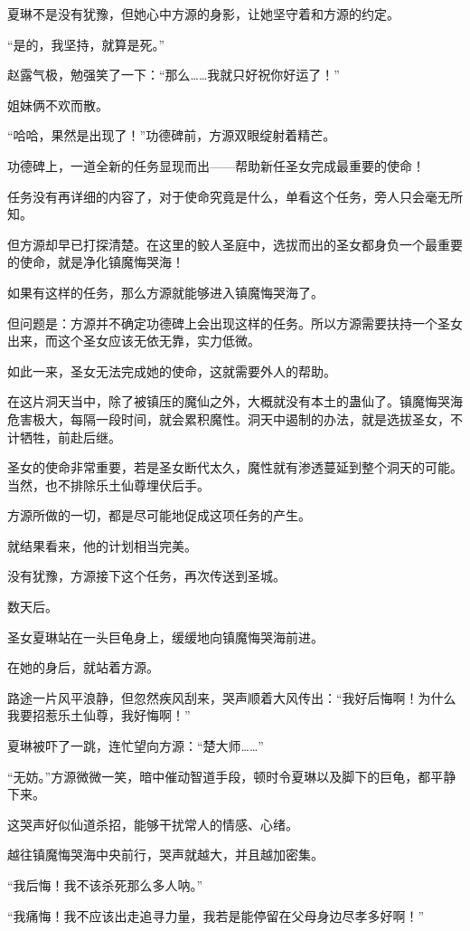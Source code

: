 \begin{this_body}
夏琳不是没有犹豫，但她心中方源的身影，让她坚守着和方源的约定。

“是的，我坚持，就算是死。”

赵露气极，勉强笑了一下：“那么……我就只好祝你好运了！”

姐妹俩不欢而散。

“哈哈，果然是出现了！”功德碑前，方源双眼绽射着精芒。

功德碑上，一道全新的任务显现而出——帮助新任圣女完成最重要的使命！

任务没有再详细的内容了，对于使命究竟是什么，单看这个任务，旁人只会毫无所知。

但方源却早已打探清楚。在这里的鲛人圣庭中，选拔而出的圣女都身负一个最重要的使命，就是净化镇魔悔哭海！

如果有这样的任务，那么方源就能够进入镇魔悔哭海了。

但问题是：方源并不确定功德碑上会出现这样的任务。所以方源需要扶持一个圣女出来，而这个圣女应该无依无靠，实力低微。

如此一来，圣女无法完成她的使命，这就需要外人的帮助。

在这片洞天当中，除了被镇压的魔仙之外，大概就没有本土的蛊仙了。镇魔悔哭海危害极大，每隔一段时间，就会累积魔性。洞天中遏制的办法，就是选拔圣女，不计牺牲，前赴后继。

圣女的使命非常重要，若是圣女断代太久，魔性就有渗透蔓延到整个洞天的可能。当然，也不排除乐土仙尊埋伏后手。

方源所做的一切，都是尽可能地促成这项任务的产生。

就结果看来，他的计划相当完美。

没有犹豫，方源接下这个任务，再次传送到圣城。

数天后。

圣女夏琳站在一头巨龟身上，缓缓地向镇魔悔哭海前进。

在她的身后，就站着方源。

路途一片风平浪静，但忽然疾风刮来，哭声顺着大风传出：“我好后悔啊！为什么我要招惹乐土仙尊，我好悔啊！”

夏琳被吓了一跳，连忙望向方源：“楚大师……”

“无妨。”方源微微一笑，暗中催动智道手段，顿时令夏琳以及脚下的巨龟，都平静下来。

这哭声好似仙道杀招，能够干扰常人的情感、心绪。

越往镇魔悔哭海中央前行，哭声就越大，并且越加密集。

“我后悔！我不该杀死那么多人呐。”

“我痛悔！我不应该出走追寻力量，我若是能停留在父母身边尽孝多好啊！”


\end{this_body}
